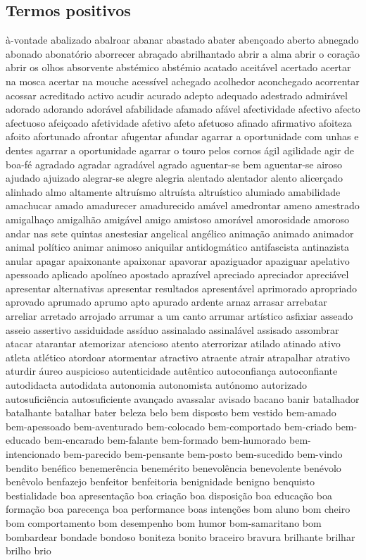 \begin{appendices}
\subsection{Termos positivos}
\`{a}-vontade abalizado abalroar abanar abastado abater aben\c{c}oado aberto abnegado abonado abonat\'{o}rio aborrecer abra\c{c}ado abrilhantado abrir a alma abrir o cora\c{c}\~ao abrir os olhos absorvente abst\'{e}mico abst\'{e}mio acatado aceit\'{a}vel acertado acertar na mosca acertar na mouche acess\'{i}vel achegado acolhedor aconchegado acorrentar acossar acreditado activo acudir acurado adepto adequado adestrado admir\'{a}vel adorado adorando ador\'{a}vel afabilidade afamado af\'{a}vel afectividade afectivo afecto afectuoso afei\c{c}oado afetividade afetivo afeto afetuoso afinado afirmativo afoiteza afoito afortunado afrontar afugentar afundar agarrar a oportunidade com unhas e dentes agarrar a oportunidade agarrar o touro pelos cornos \'{a}gil agilidade agir de boa-f\'{e} agradado agradar agrad\'{a}vel agrado aguentar-se bem aguentar-se airoso ajudado ajuizado alegrar-se alegre alegria alentado alentador alento alicer\c{c}ado alinhado almo altamente altru\'{i}smo altru\'{i}sta altru\'{i}stico alumiado amabilidade amachucar amado amadurecer amadurecido am\'{a}vel amedrontar ameno amestrado amigalha\c{c}o amigalh\~ao amig\'{a}vel amigo amistoso amor\'{a}vel amorosidade amoroso andar nas sete quintas anestesiar angelical ang\'{e}lico anima\c{c}\~ao animado animador animal pol\'{i}tico animar animoso aniquilar antidogm\'{a}tico antifascista antinazista anular apagar apaixonante apaixonar apavorar apaziguador apaziguar apelativo apessoado aplicado apol\'{i}neo apostado apraz\'{i}vel apreciado apreciador apreci\'{a}vel apresentar alternativas apresentar resultados apresent\'{a}vel aprimorado apropriado aprovado aprumado aprumo apto apurado ardente arnaz arrasar arrebatar arreliar arretado arrojado arrumar a um canto arrumar art\'{i}stico asfixiar asseado asseio assertivo assiduidade ass\'{i}duo assinalado assinal\'{a}vel assisado assombrar atacar atarantar atemorizar atencioso atento aterrorizar atilado atinado ativo atleta atl\'{e}tico atordoar atormentar atractivo atraente atrair atrapalhar atrativo aturdir \'{a}ureo auspicioso autenticidade aut\^{e}ntico autoconfian\c{c}a autoconfiante autodidacta autodidata autonomia autonomista aut\'{o}nomo autorizado autosufici\^{e}ncia autosuficiente avan\c{c}ado avassalar avisado bacano banir batalhador batalhante batalhar bater beleza belo bem disposto bem vestido bem-amado bem-apessoado bem-aventurado bem-colocado bem-comportado bem-criado bem-educado bem-encarado bem-falante bem-formado bem-humorado bem-intencionado bem-parecido bem-pensante bem-posto bem-sucedido bem-vindo bendito ben\'{e}fico benemer\^{e}ncia benem\'{e}rito benevol\^{e}ncia benevolente ben\'{e}volo ben\^{e}volo benfazejo benfeitor benfeitoria benignidade benigno benquisto bestialidade boa apresenta\c{c}\~ao boa cria\c{c}\~ao boa disposi\c{c}\~ao boa educa\c{c}\~ao boa forma\c{c}\~ao boa parecen\c{c}a boa performance boas inten\c{c}\~oes bom aluno bom cheiro bom comportamento bom desempenho bom humor bom-samaritano bom bombardear bondade bondoso boniteza bonito braceiro bravura brilhante brilhar brilho brio 
\end{appendices}
